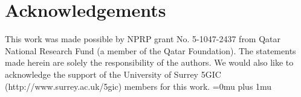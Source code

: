 \documentclass[article,10pt,twocolumn]{IEEEtran}
\begin{document}
\section*{Acknowledgements}
This work was made possible by NPRP grant No. 5-1047-2437 from Qatar National Research Fund (a member of the Qatar Foundation). The statements made herein are solely the responsibility of the authors. We would also like to acknowledge the support of the University of Surrey 5GIC (http://www.surrey.ac.uk/5gic) members for this work.
\balance
\Urlmuskip=0mu plus 1mu\relax


\end{document}
